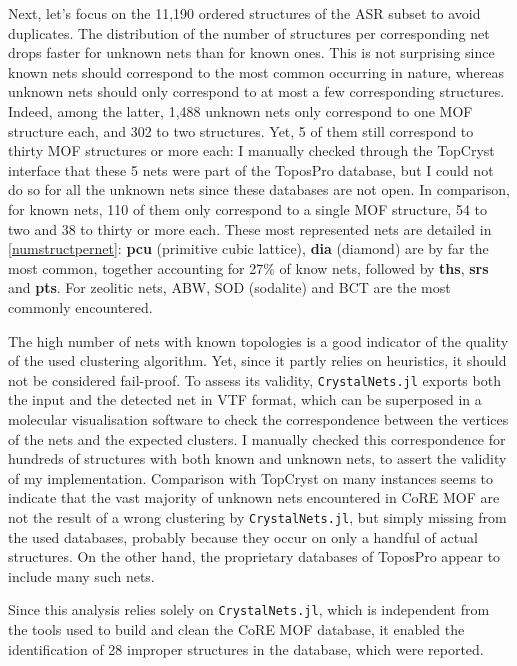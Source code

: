 \documentclass[main.tex]{subfiles}
\begin{document}
Next, let's focus on the 11,190 ordered structures of the ASR subset to avoid duplicates.
The distribution of the number of structures per corresponding net drops faster for unknown nets than for known ones. This is not surprising since known nets should correspond to the most common occurring in nature, whereas unknown nets should only correspond to at most a few corresponding structures. Indeed, among the latter, 1,488 unknown nets only correspond to one MOF structure each, and 302 to two structures. Yet, 5 of them still correspond to thirty MOF structures or more each: I manually checked through the TopCryst interface \autocite{TopCryst} that these 5 nets were part of the ToposPro database, but I could not do so for all the unknown nets since these databases are not open. In comparison, for known nets, 110 of them only correspond to a single MOF structure, 54 to two and 38 to thirty or more each. These most represented nets are detailed in \cref{numstructpernet}: \textbf{pcu} (primitive cubic lattice), \textbf{dia} (diamond) are by far the most common, together accounting for {27\%} of know nets, followed by \textbf{ths}, \textbf{srs} and \textbf{pts}. For zeolitic nets, ABW, SOD (sodalite) and BCT are the most commonly encountered.

The high number of nets with known topologies is a good indicator of the quality of the used clustering algorithm. Yet, since it partly relies on heuristics, it should not be considered fail-proof. To assess its validity, \texttt{CrystalNets.jl} exports both the input and the detected net in VTF format, which can be superposed in a molecular visualisation software to check the correspondence between the vertices of the nets and the expected clusters. I manually checked this correspondence for hundreds of structures with both known and unknown nets, to assert the validity of my implementation. Comparison with TopCryst on many instances seems to indicate that the vast majority of unknown nets encountered in CoRE MOF are not the result of a wrong clustering by \texttt{CrystalNets.jl}, but simply missing from the used databases, probably because they occur on only a handful of actual structures. On the other hand, the proprietary databases of ToposPro appear to include many such nets.

Since this analysis relies solely on \texttt{CrystalNets.jl}, which is independent from the tools used to build and clean the CoRE MOF database, it enabled the identification of 28 improper structures in the database, which were reported.
\end{document}
